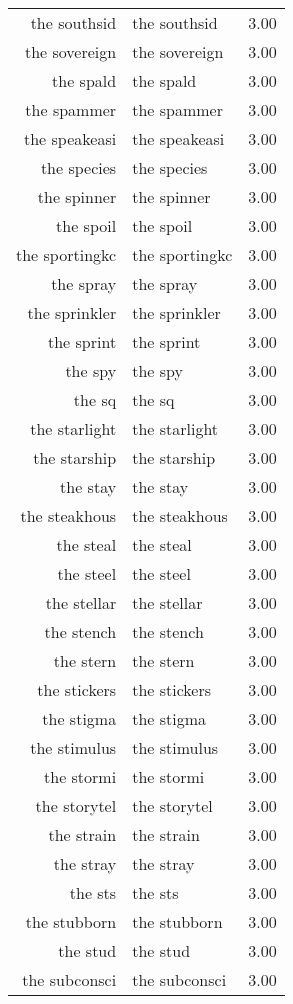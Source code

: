 \begin{table}[ht]
\begin{tabular}{rlr}
  the southsid & the southsid & 3.00 \\ 
  the sovereign & the sovereign & 3.00 \\ 
  the spald & the spald & 3.00 \\ 
  the spammer & the spammer & 3.00 \\ 
  the speakeasi & the speakeasi & 3.00 \\ 
  the species & the species & 3.00 \\ 
  the spinner & the spinner & 3.00 \\ 
  the spoil & the spoil & 3.00 \\ 
  the sportingkc & the sportingkc & 3.00 \\ 
  the spray & the spray & 3.00 \\ 
  the sprinkler & the sprinkler & 3.00 \\ 
  the sprint & the sprint & 3.00 \\ 
  the spy & the spy & 3.00 \\ 
  the sq & the sq & 3.00 \\ 
  the starlight & the starlight & 3.00 \\ 
  the starship & the starship & 3.00 \\ 
  the stay & the stay & 3.00 \\ 
  the steakhous & the steakhous & 3.00 \\ 
  the steal & the steal & 3.00 \\ 
  the steel & the steel & 3.00 \\ 
  the stellar & the stellar & 3.00 \\ 
  the stench & the stench & 3.00 \\ 
  the stern & the stern & 3.00 \\ 
  the stickers & the stickers & 3.00 \\ 
  the stigma & the stigma & 3.00 \\ 
  the stimulus & the stimulus & 3.00 \\ 
  the stormi & the stormi & 3.00 \\ 
  the storytel & the storytel & 3.00 \\ 
  the strain & the strain & 3.00 \\ 
  the stray & the stray & 3.00 \\ 
  the sts & the sts & 3.00 \\ 
  the stubborn & the stubborn & 3.00 \\ 
  the stud & the stud & 3.00 \\ 
  the subconsci & the subconsci & 3.00 \\ 

\end{tabular}
\end{table}
